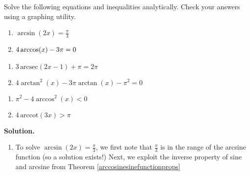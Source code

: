 \begin{ex}  Solve the following equations and inequalities analytically.  Check your answers using a graphing utility.

\begin{multicols}{2}
\begin{enumerate}

\item  $\arcsin(2x) = \frac{\pi}{3}$

\item  $4\arccos(x)-3\pi = 0 \vphantom{\frac{\pi}{3}}$

\setcounter{HW}{\value{enumi}}
\end{enumerate}
\end{multicols}

\begin{multicols}{2}
\begin{enumerate}
\setcounter{enumi}{\value{HW}}

\item  $3 \, \text{arcsec}(2x-1) + \pi = 2 \pi$

\item  $4\arctan^2(x)-3\pi \arctan(x)-\pi^2 = 0$

\setcounter{HW}{\value{enumi}}
\end{enumerate}
\end{multicols}

\begin{multicols}{2}
\begin{enumerate}
\setcounter{enumi}{\value{HW}}

\item  $\pi^2-4\arccos^{2}(x) < 0$

\item  $4 \, \text{arccot}(3x) > \pi$



\end{enumerate}
\end{multicols}

{\bf Solution.} 
\begin{enumerate}

\item  To solve $\arcsin(2x) = \frac{\pi}{3}$, we first note that $\frac{\pi}{3}$ is in the range of the arcsine function (so a solution exists!) Next, we exploit the inverse property of sine and arcsine from Theorem \ref{arccosinesinefunctionprops}

\[ \begin{array}{rclr}


\end{array}\]
\end{enumerate}
\end{ex}
